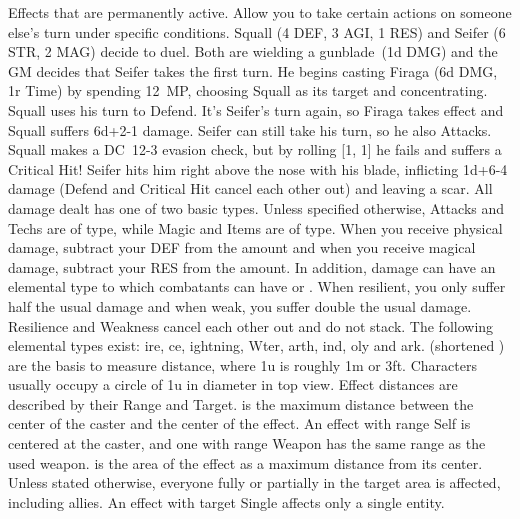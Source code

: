  Effects that are permanently active. \ofgap
{} Allow you to take certain actions on someone else's turn under specific conditions.
%
\vfill
%
{
	Squall (4 DEF, 3 AGI, 1 RES) and Seifer (6 STR, 2 MAG) decide to duel.
	Both are wielding a gunblade~(1d DMG) and the GM decides that Seifer takes the first turn.
	He begins casting Firaga (6d DMG, 1r Time) by spending 12~MP, choosing Squall as its target and concentrating.
	Squall uses his turn to Defend.
	It's Seifer's turn again, so Firaga takes effect and Squall suffers \mbox{6d+2-1} damage. 
	Seifer can still take his turn, so he also Attacks. 
	Squall makes a \mbox{DC 12-3} evasion check, but by rolling [1, 1] he fails and suffers a Critical Hit! 
	Seifer hits him right above the nose with his blade, inflicting \mbox{1d+6-4} damage (Defend and Critical Hit cancel each other out) and leaving a scar.
}
%
\clearpage
%
\newcommand{\elemicon}[1]{\hspace*{-0.14cm}#1\hspace*{-0.14cm}}
All damage dealt has one of two basic types.
Unless specified otherwise, Attacks and Techs are of  type, while Magic and Items are of  type.
When you receive physical damage, subtract your DEF from the amount and when you receive magical damage, subtract your RES from the amount.
In addition, damage can have an elemental type to which combatants can have  or . 
When resilient, you only suffer half the usual damage and when weak, you suffer double the usual damage. 
Resilience and Weakness cancel each other out and do not stack.
The following elemental types exist: \elemicon{\fire}ire, \elemicon{\ice}ce, \elemicon{\lightning}ightning, W\elemicon{\water}ter, \elemicon{\earth}arth, \elemicon{\wind}ind, \elemicon{\holy}oly and \elemicon{\dark}ark.
%
\vfill
%
 (shortened ) are the basis to measure distance, where 1u is roughly 1m or 3ft.
Characters usually occupy a circle of 1u in diameter in top view. 
Effect distances are described by their Range and Target.
 is the maximum distance between the center of the caster and the center of the effect. 
An effect with range Self is centered at the caster, and one with range Weapon has the same range as the used weapon.
 is the area of the effect as a maximum distance from its center. Unless stated otherwise, everyone fully or partially in the target area is affected, including allies.
An effect with target Single affects only a single entity.
